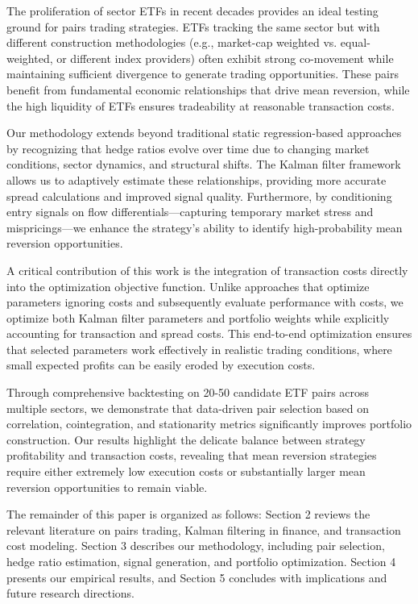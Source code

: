 \documentclass[12pt]{article}
\begin{document}
The proliferation of sector ETFs in recent decades provides an ideal testing ground for pairs trading strategies. ETFs tracking the same sector but with different construction methodologies (e.g., market-cap weighted vs. equal-weighted, or different index providers) often exhibit strong co-movement while maintaining sufficient divergence to generate trading opportunities. These pairs benefit from fundamental economic relationships that drive mean reversion, while the high liquidity of ETFs ensures tradeability at reasonable transaction costs.

Our methodology extends beyond traditional static regression-based approaches by recognizing that hedge ratios evolve over time due to changing market conditions, sector dynamics, and structural shifts. The Kalman filter framework allows us to adaptively estimate these relationships, providing more accurate spread calculations and improved signal quality. Furthermore, by conditioning entry signals on flow differentials—capturing temporary market stress and mispricings—we enhance the strategy's ability to identify high-probability mean reversion opportunities.

A critical contribution of this work is the integration of transaction costs directly into the optimization objective function. Unlike approaches that optimize parameters ignoring costs and subsequently evaluate performance with costs, we optimize both Kalman filter parameters and portfolio weights while explicitly accounting for transaction and spread costs. This end-to-end optimization ensures that selected parameters work effectively in realistic trading conditions, where small expected profits can be easily eroded by execution costs.

Through comprehensive backtesting on 20-50 candidate ETF pairs across multiple sectors, we demonstrate that data-driven pair selection based on correlation, cointegration, and stationarity metrics significantly improves portfolio construction. Our results highlight the delicate balance between strategy profitability and transaction costs, revealing that mean reversion strategies require either extremely low execution costs or substantially larger mean reversion opportunities to remain viable.

The remainder of this paper is organized as follows: Section 2 reviews the relevant literature on pairs trading, Kalman filtering in finance, and transaction cost modeling. Section 3 describes our methodology, including pair selection, hedge ratio estimation, signal generation, and portfolio optimization. Section 4 presents our empirical results, and Section 5 concludes with implications and future research directions.
\end{document}
